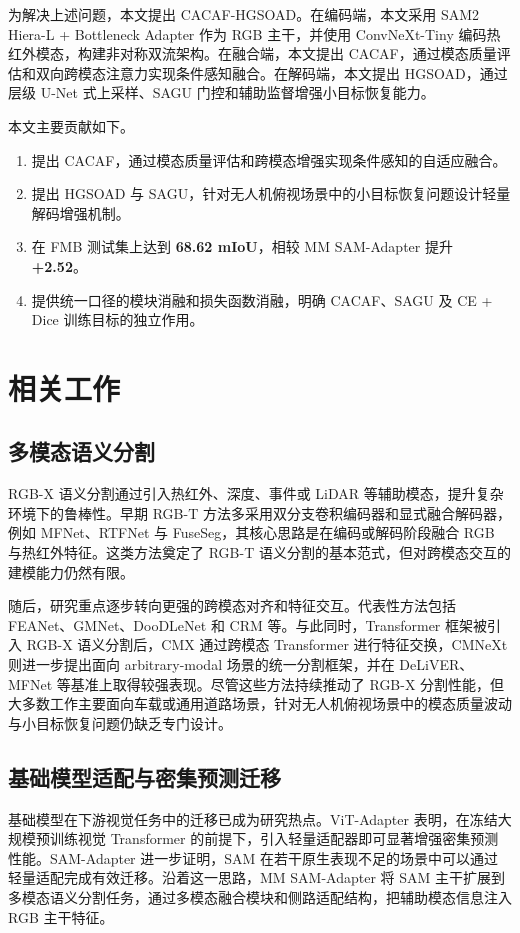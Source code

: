 \documentclass[UTF8,10pt,twocolumn]{ctexart}
\newcommand{\method}{CACAF-HGSOAD}
\begin{document}
为解决上述问题，本文提出 \method{}。在编码端，本文采用 SAM2 Hiera-L + Bottleneck Adapter 作为 RGB 主干，并使用 ConvNeXt-Tiny 编码热红外模态，构建非对称双流架构。在融合端，本文提出 CACAF，通过模态质量评估和双向跨模态注意力实现条件感知融合。在解码端，本文提出 HGSOAD，通过层级 U-Net 式上采样、SAGU 门控和辅助监督增强小目标恢复能力。

本文主要贡献如下。
\begin{enumerate}
    \item 提出 CACAF，通过模态质量评估和跨模态增强实现条件感知的自适应融合。
    \item 提出 HGSOAD 与 SAGU，针对无人机俯视场景中的小目标恢复问题设计轻量解码增强机制。
    \item 在 FMB 测试集上达到 \textbf{68.62 mIoU}，相较 MM SAM-Adapter 提升 \textbf{+2.52}。
    \item 提供统一口径的模块消融和损失函数消融，明确 CACAF、SAGU 及 CE + Dice 训练目标的独立作用。
\end{enumerate}

\section{相关工作}

\subsection{多模态语义分割}

RGB-X 语义分割通过引入热红外、深度、事件或 LiDAR 等辅助模态，提升复杂环境下的鲁棒性。早期 RGB-T 方法多采用双分支卷积编码器和显式融合解码器，例如 MFNet、RTFNet 与 FuseSeg，其核心思路是在编码或解码阶段融合 RGB 与热红外特征。这类方法奠定了 RGB-T 语义分割的基本范式，但对跨模态交互的建模能力仍然有限。

随后，研究重点逐步转向更强的跨模态对齐和特征交互。代表性方法包括 FEANet、GMNet、DooDLeNet 和 CRM 等。与此同时，Transformer 框架被引入 RGB-X 语义分割后，CMX 通过跨模态 Transformer 进行特征交换，CMNeXt 则进一步提出面向 arbitrary-modal 场景的统一分割框架，并在 DeLiVER、MFNet 等基准上取得较强表现。尽管这些方法持续推动了 RGB-X 分割性能，但大多数工作主要面向车载或通用道路场景，针对无人机俯视场景中的模态质量波动与小目标恢复问题仍缺乏专门设计。

\subsection{基础模型适配与密集预测迁移}

基础模型在下游视觉任务中的迁移已成为研究热点。ViT-Adapter 表明，在冻结大规模预训练视觉 Transformer 的前提下，引入轻量适配器即可显著增强密集预测性能。SAM-Adapter 进一步证明，SAM 在若干原生表现不足的场景中可以通过轻量适配完成有效迁移。沿着这一思路，MM SAM-Adapter 将 SAM 主干扩展到多模态语义分割任务，通过多模态融合模块和侧路适配结构，把辅助模态信息注入 RGB 主干特征。
\end{document}

